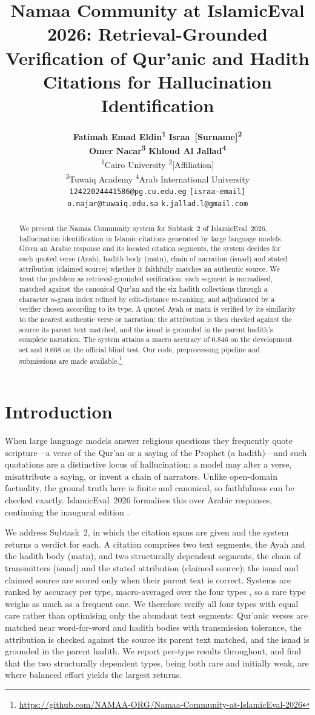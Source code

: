 \documentclass[11pt]{article}
\title{Namaa Community at IslamicEval 2026: Retrieval-Grounded Verification of
Qur'anic and Hadith Citations for Hallucination Identification}
\author{%
\textbf{Fatimah Emad Eldin\textsuperscript{1}} \quad \textbf{Israa~[Surname]\textsuperscript{2}} \\[2pt]
\textbf{Omer Nacar\textsuperscript{3}} \quad \textbf{Khloud Al Jallad\textsuperscript{4}} \\[5pt]
\normalfont \textsuperscript{1}Cairo University \quad \textsuperscript{2}[Affiliation] \\
\normalfont \textsuperscript{3}Tuwaiq Academy \quad
\textsuperscript{4}Arab International University \\[5pt]
\normalfont\small \texttt{12422024441586@pg.cu.edu.eg} \quad \texttt{[israa-email]} \\
\normalfont\small \texttt{o.najar@tuwaiq.edu.sa} \quad \texttt{k.jallad.l@gmail.com}}
\newcommand{\coderepo}{\url{https://github.com/NAMAA-ORG/Namaa-Community-at-IslamicEval-2026}}
\begin{document}
\maketitle

\begin{abstract}
We present the Namaa Community system for Subtask~2 of IslamicEval~2026, hallucination identification
in Islamic citations generated by large language models. Given an Arabic response and its located
citation segments, the system decides for each quoted verse (Ayah), hadith body (matn), chain of
narration (isnad) and stated attribution (claimed source) whether it faithfully matches an authentic
source. We treat the problem as retrieval-grounded verification: each segment is normalised, matched
against the canonical Qur'an and the six hadith collections through a character $n$-gram index refined
by edit-distance re-ranking, and adjudicated by a verifier chosen according to its type. A quoted Ayah
or matn is verified by its similarity to the nearest authentic verse or narration; the attribution is
then checked against the source its parent text matched, and the isnad is grounded in the parent
hadith's complete narration. The system attains a macro accuracy of $0.846$ on the development set and
$0.668$ on the official blind test. Our code, preprocessing pipeline and submissions are made
available.\footnote{\coderepo}
\end{abstract}

\section{Introduction}
When large language models answer religious questions they frequently quote scripture---a verse of the
Qur'an or a saying of the Prophet (a hadith)---and such quotations are a distinctive locus of
hallucination: a model may alter a verse, misattribute a saying, or invent a chain of narrators.
Unlike open-domain factuality, the ground truth here is finite and canonical, so faithfulness can be
checked exactly. IslamicEval~2026 \citep{alharbi-etal-2026-islamiceval} formalises this over Arabic
responses, continuing the inaugural edition \citep{mubarak2025islamiceval}.

We address Subtask~2, in which the citation spans are given and the system returns a verdict for each.
A citation comprises two text segments, the Ayah and the hadith body (matn), and two structurally
dependent segments, the chain of transmitters (isnad) and the stated attribution (claimed source); the
isnad and claimed source are scored only when their parent text is correct. Systems are ranked by
accuracy per type, macro-averaged over the four types \citep{alharbi-etal-2026-islamiceval}, so a rare
type weighs as much as a frequent one. We therefore verify all four types with equal care rather than
optimising only the abundant text segments: Qur'anic verses are matched near word-for-word and hadith
bodies with transmission tolerance, the attribution is checked against the source its parent text
matched, and the isnad is grounded in the parent hadith. We report per-type results throughout, and
find that the two structurally dependent types, being both rare and initially weak, are where balanced
effort yields the largest returns.
\end{document}
